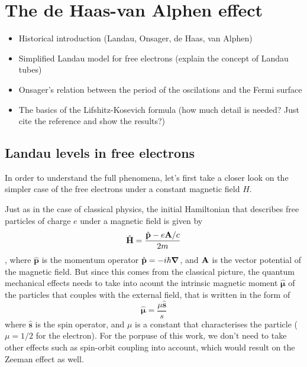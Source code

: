 \documentclass[prd,amsfonts,onecolumn,superscriptaddress,aps,nofootinbib,11pt]{revtex4}
\newcommand{\bhat}[1]{\hat{\mathbf{#1}}}
\begin{document}
\section{The de Haas-van Alphen effect}
\label{sec:dHVa}


\begin{itemize}
    \item Historical introduction (Landau, Onsager, de Haas, van Alphen)
    \item Simplified Landau model for free electrons (explain the concept of Landau tubes)
    \item Onsager's relation between the period of the oscilations and the Fermi surface
    \item The basics of the Lifshitz-Kosevich formula (how much detail is needed? Just cite the reference and show the results?)
\end{itemize}



\subsection{Landau levels in free electrons}



In order to understand the full phenomena, let's first take a closer look on the simpler case of the free electrons under a constant magnetic field $H$.

Just as in the case of classical physics, the initial Hamiltonian that describes free particles of charge $e$ under a magnetic field is given by
\begin{equation}
    \bhat{H} = \frac{\bhat{p} - e\vb{A}/c}{2 m}
\end{equation}
, where $\bhat{p}$ is the momentum operator $\bhat{p} = -i \hbar \grad$, and $\vb{A}$ is the vector potential of the magnetic field. But since this comes from the classical picture, the quantum mechanical effects needs to take into acount the intrinsic magnetic moment $\bhat{\mu}$ of the particles that couples with the external field, that is written in the form of
\begin{equation}
    \bhat{\mu} =\frac{\mu \bhat{s}}{s}
\end{equation}
where $\bhat{s}$ is the spin operator, and $\mu$ is a constant that characterises the particle ($\mu = 1/2$ for the electron). For the porpuse of this work, we don't need to take other effects such as spin-orbit coupling into account, which would result on the Zeeman effect as well.
\end{document}
